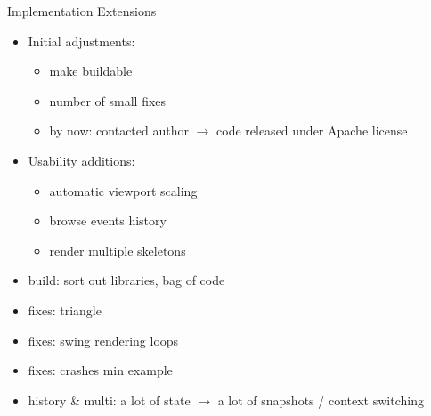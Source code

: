\documentclass[
  size=9pt,
  style=jefka,
  paper=screen,
  mode=print,
  display=slides,
  nohandoutpagebreaks,
  pauseslide,
  hlsections,
  fleqn,
  dvips,
  clock
]{powerdot}
\begin{document}
\begin{slide}{Implementation Extensions}
  \begin{itemize}

    \item Initial adjustments:
    \begin{itemize}
      \item make buildable
      \item number of small fixes
      \item by now: contacted author $\rightarrow$ code released under Apache license
    \end{itemize}

    \item Usability additions:
    \begin{itemize}
      \item automatic viewport scaling
      \item browse events history
      \item render multiple skeletons
    \end{itemize}

  \end{itemize}
\end{slide}
\begin{note}{}
  \begin{itemize}
    \item build: sort out libraries, bag of code
    \item fixes: triangle
    \item fixes: swing rendering loops
    \item fixes: crashes min example
    \item history \& multi: a lot of state $\rightarrow$ a lot of snapshots / context switching
  \end{itemize}
\end{note}
\end{document}
